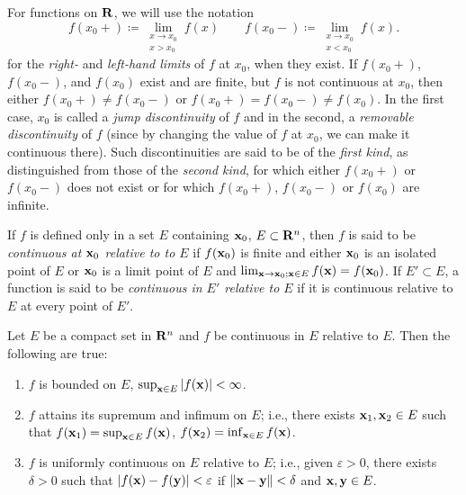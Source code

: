 For functions on $\mathbf{R}$, we will use the notation
\begin{equation}
  \label{eq:continuous-function}
f(x_0+)\coloneqq\lim_{\substack{x\to x_0\\x>x_0}}f(x)\qquad
f(x_0-)\coloneqq\lim_{\substack{x\to x_0\\x<x_0}}f(x).
\end{equation}
for the \emph{right-} and \emph{left-hand limits} of $f$ at $x_0$, when
they exist. If $f(x_0+)$, $f(x_0-)$, and $f(x_0)$ exist and are finite, but
$f$ is not continuous at $x_0$, then either $f(x_0+)\neq f(x_0-)$ or
$f(x_0+)=f(x_0-)\neq f(x_0)$. In the first case, $x_0$ is called a
\emph{jump discontinuity} of $f$ and in the second, a \emph{removable
  discontinuity} of $f$ (since by changing the value of $f$ at $x_0$, we
can make it continuous there). Such discontinuities are said to be of the
\emph{first kind}, as distinguished from those of the \emph{second kind},
for which either $f(x_0+)$ or $f(x_0-)$ does not exist or for which
$f(x_0+)$, $f(x_0-)$ or $f(x_0)$ are infinite.

If $f$ is defined only in a set $E$ containing $\mathbf{x}_0$, $E\subset\mathbf{R}^n$,
then $f$ is said to be \emph{continuous at $\mathbf{x}_0$ relative to  to $E$} if
$f(\mathbf{x}_0)$ is finite and either $\mathbf{x}_0$ is an isolated point of $E$ or
$\mathbf{x}_0$ is a limit point of $E$ and $\lim_{\mathbf{x}\to\mathbf{x}_0;\mathbf{x}\in
  E}f(\mathbf{x})=f(\mathbf{x}_0)$. If $E'\subset E$, a function is said to be
\emph{continuous in $E'$ relative to $E$} if it is continuous relative to
$E$ at every point of $E'$.

\begin{theorem}[1.15]
Let $E$ be a compact set in $\mathbf{R}^n$ and $f$ be continuous in $E$ relative
to $E$. Then the following are true:
\begin{enumerate}[label=\textnormal{(\roman*)}]
\item $f$ is bounded on $E$, $\sup_{\mathbf{x}\in E}|f(\mathbf{x})|<\infty$.
\item $f$ attains its supremum and infimum on $E$; i.e., there exists
  $\mathbf{x}_1,\mathbf{x}_2\in E$ such that $f(\mathbf{x}_1)=\sup_{\mathbf{x}\in E}f(\mathbf{x})$,
  $f(\mathbf{x}_2)=\inf_{\mathbf{x}\in E}f(\mathbf{x})$.
\item $f$ is uniformly continuous on $E$ relative to $E$; i.e., given
  $\varepsilon>0$, there exists $\delta>0$ such that
  $|f(\mathbf{x})-f(\mathbf{y})|<\varepsilon$ if $\|\mathbf{x}-\mathbf{y}\|<\delta$ and
  $\mathbf{x},\mathbf{y}\in E$.
\end{enumerate}
\end{theorem}

